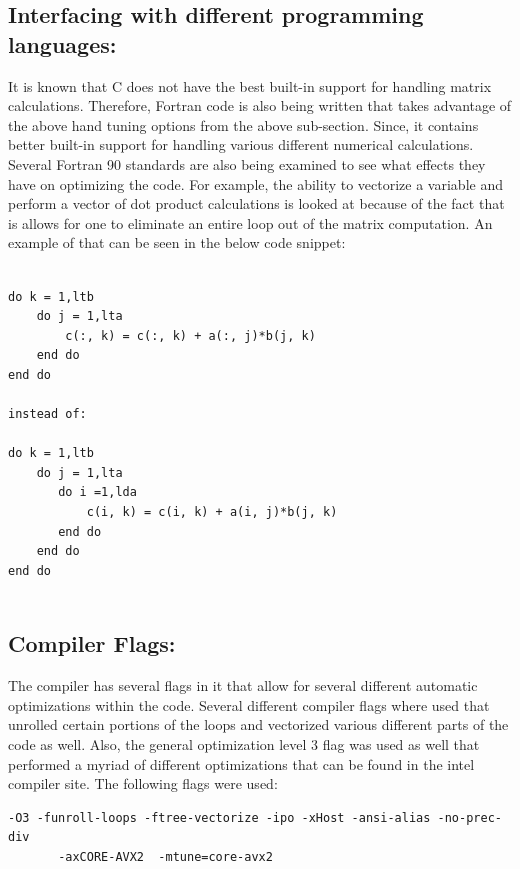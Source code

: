 \documentclass{article}
\begin{document}
\subsection*{Interfacing with different programming languages:}

It is known that C does not have the best built-in support for handling matrix calculations. Therefore, Fortran code is also being written that takes advantage of the above hand tuning options from the above sub-section. Since, it contains better built-in support for handling various different numerical calculations. Several Fortran 90 standards are also being examined to see what effects they have on optimizing the code. For example, the ability to vectorize a variable and perform a vector of dot product calculations is looked at because of the fact that is allows for one to eliminate an entire loop out of the matrix computation. An example of that can be seen in the below code snippet:
\begin{verbatim}

do k = 1,ltb
    do j = 1,lta
        c(:, k) = c(:, k) + a(:, j)*b(j, k)
    end do
end do

instead of:

do k = 1,ltb
    do j = 1,lta
       do i =1,lda
           c(i, k) = c(i, k) + a(i, j)*b(j, k)
       end do
    end do
end do


\end{verbatim}

\subsection*{Compiler Flags:}

The compiler has several flags in it that allow for several different automatic optimizations within the code. Several different compiler flags where used that unrolled certain portions of the loops and vectorized various different parts of the code as well.  Also, the general optimization level 3 flag was used as well that performed a myriad of different optimizations that can be found in the intel compiler site. The following flags were used:

\begin{verbatim}
-O3 -funroll-loops -ftree-vectorize -ipo -xHost -ansi-alias -no-prec-div 
       -axCORE-AVX2  -mtune=core-avx2
\end{verbatim}
\end{document}
